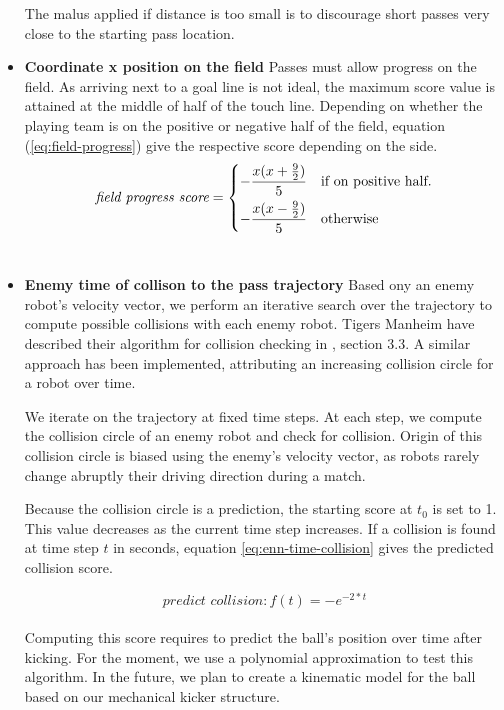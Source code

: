 \begin{itemize}
    The malus applied if distance is too small is to discourage
    short passes very close to the starting pass location. \\
    
    \item \textbf{Coordinate x position on the field}
    Passes must allow progress on the field. As arriving next to a goal line is not ideal, the maximum score value
    is attained at the middle of half of the touch line. Depending on whether the playing team is on the positive
    or negative half of the field, equation (\ref{eq:field-progress}) give the respective score depending on the side.
    \begin{equation}
        \label{eq:field-progress}
        \textit{field progress score} =
        \begin{dcases}
            -\frac{x (x + \frac{9}{2})}{5} & \text{if on positive half}. \\
            -\frac{x (x - \frac{9}{2})}{5} & \text{otherwise}
        \end{dcases}
    \end{equation} \\

    \item \textbf{Enemy time of collison to the pass trajectory}
    Based ony an enemy robot's velocity vector,
    we perform an iterative search over the trajectory to compute possible collisions with each
    enemy robot. Tigers Manheim have described their algorithm for collision checking in \cite{tdp_tigers_2024}, section 3.3.
    A similar approach has been implemented, attributing an increasing collision circle for a robot over time.

    We iterate on the trajectory at fixed time steps. At each step, we compute the collision circle of an enemy robot
    and check for collision. Origin of this collision circle is biased using the enemy's velocity vector, as robots rarely change
    abruptly their driving direction during a match.

    Because the collision circle is a prediction, the starting score at $t_0$ is set to 1. This value
    decreases as the current time step increases. If a collision is found at time step $t$ in seconds,
    equation \ref{eq:enn-time-collision} gives the predicted collision score.

    \begin{equation}
        \label{eq:enn-time-collision}
        \textit{predict collision}: f(t) = -e^{-2 * t}
    \end{equation} \\

    Computing this score requires to predict the ball's position over time after kicking.
    For the moment, we use a polynomial approximation to test this algorithm. In the future, we plan to create
    a kinematic model for the ball based on our mechanical kicker structure.

\end{itemize}

